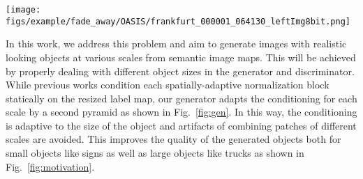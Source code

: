 \documentclass{bmvc2k}
\newcommand{\figref}[1]{Fig.~\ref{#1}}
\begin{document}
\begin{figure*}[t]
{\begin{minipage}[t]{0.195\linewidth}
\texttt{[image: figs/example/fade\_away/OASIS/frankfurt\_000001\_064130\_leftImg8bit.png]} \\
\end{minipage}
} \hspace*{-3mm}
\caption{Given a label map (a) as input, current approaches like SPADE (c) or OASIS (d) struggle to generate realistic looking objects. In particular large objects like trucks look highly unrealistic. Instead of generating a consistent appearance of an object, the methods generate a collage of patches. For instance,  when zooming in on the truck in the top row of (d), it can be seen that the truck is a combination of patches from the side and back view of a car or van and four wheels are visible. They also struggle to generate other objects like traffic signs (row 2) or bollards (row 3). This is due to the handling of scale in the generator and discriminator, which is addressed by our approach (e). 
}
\vspace{-4mm}
\label{fig:motivation}
\end{figure*}

In this work, we address this problem and aim to generate images with realistic looking objects at various scales from semantic image maps. This will be achieved by properly dealing with different object sizes in the generator and discriminator. While previous works \cite{park2019semantic,schonfeld_sushko_iclr2021} condition each spatially-adaptive normalization block statically on the resized label map, our generator adapts the conditioning for each scale by a second pyramid as shown in \figref{fig:gen}. In this way, the conditioning is adaptive to the size of the object and artifacts of combining patches of different scales are avoided. This improves the quality of the generated objects both for small objects like signs as well as large objects like trucks as shown in \figref{fig:motivation}.          
\end{document}
